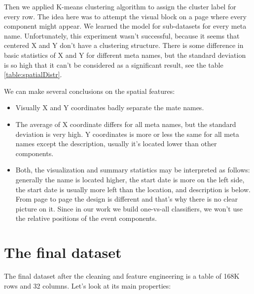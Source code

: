 Then we applied K-means clustering algorithm to assign the cluster label for every row. The idea here was to attempt the visual block on a page where every component might appear. We learned the model for sub-datasets for every meta name. Unfortunately, this experiment wasn't successful, because it seems that centered X and Y don't have a clustering structure. There is some difference in basic statistics of X and Y for different meta names, but the standard deviation is so high that it can't be considered as a significant result, see the table \ref{table:spatialDistr}.


We can make several conclusions on the spatial features:
\begin{itemize}
    \item Visually X and Y coordinates badly separate the mate names.
    \item The average of X coordinate differs for all meta names, but the standard deviation is very high. Y coordinates is more or less the same for all meta names except the description, usually it's located lower than other components.
    \item Both, the visualization and summary statistics may be interpreted as follows: generally the name is located higher, the start date is more on the left side, the start date is usually more left than the location, and description is below. From page to page the design is different and that's why there is no clear picture on it. Since in our work we build one-vs-all classifiers, we won't use the relative positions of the event components.     
\end{itemize}


\section{The final dataset}
The final dataset after the cleaning and feature engineering is a table of 168K rows and 32 columns. Let's look at its main properties: 

